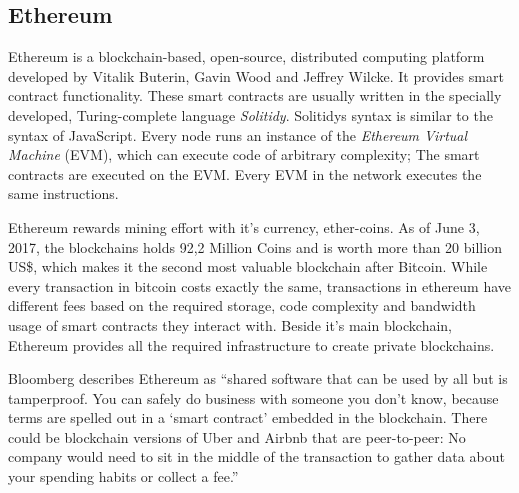 \subsection{Ethereum}
Ethereum is a blockchain-based, open-source, distributed computing platform developed by Vitalik Buterin, Gavin Wood and Jeffrey Wilcke.
It provides smart contract functionality. These smart contracts are usually written in the specially developed, Turing-complete language \emph{Solitidy}.
Solitidys syntax is similar to the syntax of JavaScript.
Every node runs an instance of the \emph{Ethereum Virtual Machine} (EVM), which can execute code of arbitrary complexity; The smart contracts are executed on the EVM.
Every EVM in the network executes the same instructions.

Ethereum rewards mining effort with it's currency, ether-coins.
As of June 3, 2017, the blockchains holds 92,2 Million Coins and is worth more than 20 billion US\$, which makes it the second most valuable blockchain after Bitcoin.
While every transaction in bitcoin costs exactly the same, transactions in ethereum have different fees based on the required storage, code complexity and bandwidth usage of smart contracts they interact with.
Beside it's main blockchain, Ethereum provides all the required infrastructure to create private blockchains.
\cite{ethereum, wiki:ethereum}

Bloomberg \cite{bloomberg:eth} describes Ethereum as \enquote{shared software that can be used by all but is tamperproof. You can safely do business with someone you don’t know, because terms are spelled out in a \enquote{smart contract} embedded in the blockchain. There could be blockchain versions of Uber and Airbnb that are peer-to-peer: No company would need to sit in the middle of the transaction to gather data about your spending habits or collect a fee.} %

